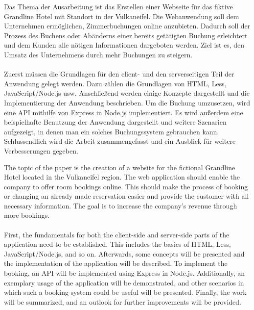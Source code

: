 \kurzfassung

Das Thema der Ausarbeitung ist das Erstellen einer Webseite für das fiktive Grandline Hotel mit Standort in der Vulkaneifel. Die Webanwendung soll dem Unternehmen ermöglichen, Zimmerbuchungen online anzubieten. Dadurch soll der Prozess des Buchens oder Abänderns einer bereits getätigten Buchung erleichtert und dem Kunden alle nötigen Informationen dargeboten werden. Ziel ist es, den Umsatz des Unternehmens durch mehr Buchungen zu steigern.
\\
\\ 
Zuerst müssen die Grundlagen für den client- und den serverseitigen Teil der Anwendung gelegt werden. Dazu zählen die Grundlagen von HTML, Less, JavaScript/Node.js usw. Anschließend werden einige Konzepte dargestellt und die Implementierung der Anwendung beschrieben. Um die Buchung umzusetzen, wird eine API mithilfe von Express in Node.js implementiert. Es wird außerdem eine beispielhafte Benutzung der Anwendung dargestellt und weitere Szenarien aufgezeigt, in denen man ein solches Buchungssystem gebrauchen kann. Schlussendlich wird die Arbeit zusammengefasst und ein Ausblick für weitere Verbesserungen gegeben.

\kurzfassungEN

The topic of the paper is the creation of a website for the fictional Grandline Hotel located in the Vulkaneifel region. The web application should enable the company to offer room bookings online. This should make the process of booking or changing an already made reservation easier and provide the customer with all necessary information. The goal is to increase the company's revenue through more bookings.
\\
\\
First, the fundamentals for both the client-side and server-side parts of the application need to be established. This includes the basics of HTML, Less, JavaScript/Node.js, and so on. Afterwards, some concepts will be presented and the implementation of the application will be described. To implement the booking, an API will be implemented using Express in Node.js. Additionally, an exemplary usage of the application will be demonstrated, and other scenarios in which such a booking system could be useful will be presented. Finally, the work will be summarized, and an outlook for further improvements will be provided.
